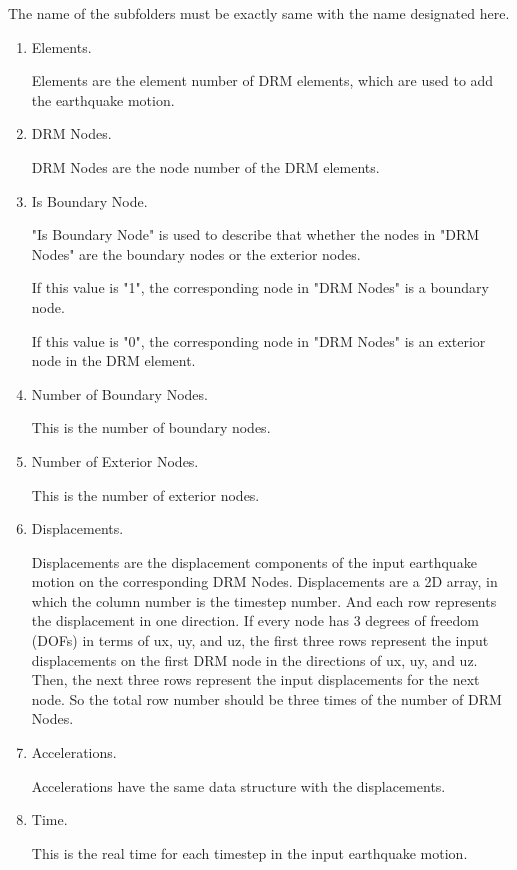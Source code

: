 \documentclass[fleqn,11pt]{article}
\begin{document}
The name of the subfolders must be exactly same with the name designated here.

\begin{enumerate}
  \item Elements. 
  
  Elements are the element number of DRM elements, which are used to add the earthquake motion. 

  \item DRM Nodes. 
  
  DRM Nodes are the node number of the DRM elements. 

  \item Is Boundary Node. 

  "Is Boundary Node" is used to describe that whether the nodes in "DRM Nodes" are the boundary nodes or the exterior nodes.

  If this value is "1", the corresponding node in "DRM Nodes" is a boundary node.

  If this value is "0", the corresponding node in  "DRM Nodes" is an exterior node in the DRM element.

  \item Number of Boundary Nodes. 

  This is the number of boundary nodes.

  \item Number of Exterior Nodes. 

  This is the number of exterior nodes.

  \item Displacements. 

  Displacements are the displacement components of the input earthquake motion on the corresponding DRM Nodes. Displacements are a 2D array, in which the column number is the timestep number. And each row represents the displacement in one direction. If every node has 3 degrees of freedom (DOFs) in terms of ux, uy, and uz, the first three rows represent the input displacements on the first DRM node in the directions of ux, uy, and uz. Then, the next three rows represent the input displacements for the next node. So the total row number should be three times of the number of DRM Nodes.

  \item Accelerations. 

  Accelerations have the same data structure with the displacements. 
  
  \item Time. 

  This is the real time for each timestep in the input earthquake motion. 


\end{enumerate}
\end{document}
